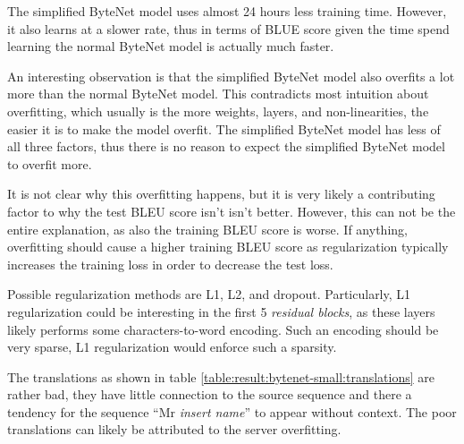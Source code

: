 The simplified ByteNet model uses almost 24 hours less training time. However, it also learns at a slower rate, thus in terms of BLUE score given the time spend learning the normal ByteNet model is actually much faster.

An interesting observation is that the simplified ByteNet model also overfits a lot more than the normal ByteNet model. This contradicts most intuition about overfitting, which usually is the more weights, layers, and non-linearities, the easier it is to make the model overfit. The simplified ByteNet model has less of all three factors, thus there is no reason to expect the simplified ByteNet model to overfit more.

It is not clear why this overfitting happens, but it is very likely a contributing factor to why the test BLEU score isn't isn't better. However, this can not be the entire explanation, as also the training BLEU score is worse. If anything, overfitting should cause a higher training BLEU score as regularization typically increases the training loss in order to decrease the test loss.

Possible regularization methods are L1, L2, and dropout. Particularly, L1 regularization could be interesting in the first 5 \textit{residual blocks}, as these layers likely performs some characters-to-word encoding. Such an encoding should be very sparse, L1 regularization would enforce such a sparsity.

The translations as shown in table \ref{table:result:bytenet-small:translations} are rather bad, they have little connection to the source sequence and there a tendency for the sequence ``Mr \textit{insert name}'' to appear without context. The poor translations can likely be attributed to the server overfitting. 

